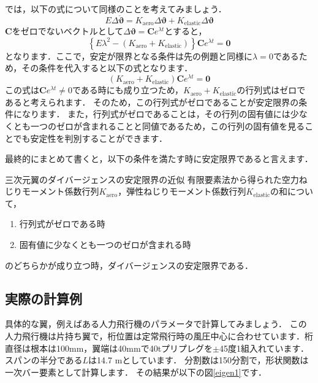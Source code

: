 \documentclass{jarticle}
\begin{document}
では，以下の式について同様のことを考えてみましょう．
\begin{equation}
    E\Delta\ddot{\bm{\vartheta}} = K_\mathrm{aero} \Delta\bm{\vartheta} + K_\mathrm{elastic} \Delta\bm{\vartheta}
\end{equation}
$\bm{C}$をゼロでないベクトルとして$\Delta\bm{\vartheta} = \bm{C}e^{\lambda t}$とすると，
\begin{equation}
    \left\{ E\lambda^2 - (K_\mathrm{aero} + K_\mathrm{elastic}) \right\}\bm{C}e^{\lambda t} = \bm{0}
\end{equation}
となります．ここで，安定が限界となる条件は先の例題と同様に$\lambda = 0$であるため，その条件を代入すると以下の式となります．
\begin{equation}
    (K_\mathrm{aero} + K_\mathrm{elastic})\bm{C}e^{\lambda t} = \bm{0}
\end{equation}
この式は$\bm{C}e^{\lambda t} \neq 0$である時にも成り立つため，$K_\mathrm{aero} + K_\mathrm{elastic}$の行列式はゼロであると考えられます．
そのため，この行列式がゼロであることが安定限界の条件になります．
また，行列式がゼロであることは，その行列の固有値には少なくとも一つのゼロが含まれることと同値であるため，この行列の固有値を見ることでも安定性を判別することができます．

最終的にまとめて書くと，以下の条件を満たす時に安定限界であると言えます．
\begin{itembox}[l]{三次元翼のダイバージェンスの安定限界の近似}
    有限要素法から得られた空力ねじりモーメント係数行列$K_\mathrm{aero}$，弾性ねじりモーメント係数行列$K_\mathrm{elastic}$の和について，
    \begin{enumerate}
        \item 行列式がゼロである時
        \item 固有値に少なくとも一つのゼロが含まれる時
    \end{enumerate}
    のどちらかが成り立つ時，ダイバージェンスの安定限界である．
\end{itembox}


\subsection{実際の計算例}

具体的な翼，例えばある人力飛行機のパラメータで計算してみましょう．
この人力飛行機は片持ち翼で，桁位置は定常飛行時の風圧中心に合わせています．桁直径は根本は100mm，翼端は40mmで40tプリプレグを$\pm$45度1組入れています．
スパンの半分である$L$は14.7 mとしています．
分割数は150分割で，形状関数は一次バー要素として計算します．
その結果が以下の図\ref{eigen1}です．
\end{document}
